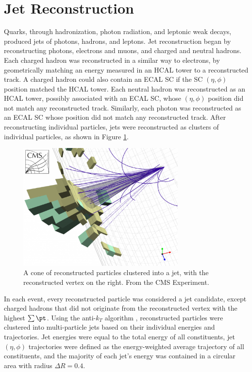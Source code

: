 \section{Jet Reconstruction}
\label{sec:jetReco}
Quarks, through hadronization, photon radiation, and leptonic weak decays, produced jets of photons, 
hadrons, and leptons.  Jet reconstruction began by reconstructing photons, 
electrons and muons, and charged and neutral hadrons.  Each charged hadron was reconstructed in a 
similar way to electrons, by geometrically matching an energy measured in an HCAL tower to a 
reconstructed track.  A charged hadron could also contain an ECAL SC if the SC $(\eta, \phi)$ position 
matched the HCAL tower.  Each neutral hadron was reconstructed as an HCAL tower, possibly associated with 
an ECAL SC, whose $(\eta, \phi)$ position did not match any reconstructed track.  Similarly, 
each photon was reconstructed as an ECAL SC whose position did not match any reconstructed track.  
After reconstructing individual particles, jets were reconstructed as clusters of individual particles, 
as shown in Figure \ref{fig:jetClustering}.

\begin{figure}[h]
	\centering
	\includegraphics[width=0.75\textwidth]{figures/jetClusteringInCMS.png}
	\caption{A cone of reconstructed particles clustered into a jet, with the reconstructed vertex on the right.  
	From the CMS Experiment.}
	\label{fig:jetClustering}
\end{figure}

In each event, every reconstructed particle was considered a jet candidate, except charged 
hadrons that did not originate from the reconstructed vertex with the highest $\sum \pt$.  Using the 
anti-$k_{T}$ algorithm \cite{antikt}, reconstructed particles were clustered into multi-particle jets 
based on their individual energies and trajectories.  Jet energies were equal to the total energy of 
all constituents, jet $(\eta, \phi)$ trajectories were defined as the energy-weighted average trajectory 
of all constituents, and the majority of each jet's energy was contained in a circular area with radius 
$\Delta R = 0.4$.


